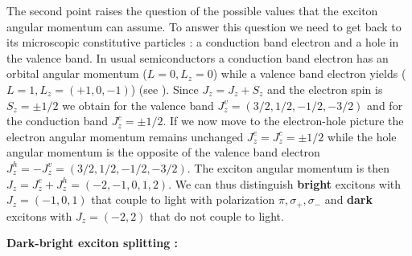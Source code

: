 The second point raises the question of the possible values that the exciton angular momentum can assume. To answer this question we need to get back to its 
microscopic constitutive particles : a conduction band electron and a hole in the valence band. In usual semiconductors a conduction band electron has an orbital angular momentum ($L=0 , L_z=0$) while a valence band electron yields ($L=1 , L_z=(+1,0,-1)$) (see \cite{Combescot_cooper_excitons_2015}).
Since $J_z = J_z + S_z$ and the electron spin is $S_z = \pm 1/2$ we obtain for the valence band $J_z^{v} = (3/2, 1/2, -1/2, -3/2)$ and for the conduction band $J_z^{c} = \pm 1/2$. If we now move to the electron-hole picture the electron angular momentum remains unchanged $J_z^{e}=J_z^{c}= \pm 1/2$ while the hole angular momentum is the opposite of the valence band electron $J_z^{h} = -J_z^{v}=(3/2, 1/2, -1/2, -3/2)$.
 The exciton angular momentum is then $J_z = J_z^{e} + J_z^{h} = (-2,-1,0,1,2)$. We can thus distinguish \textbf{bright} excitons with $J_z = (-1,0,1)$ that couple to light with polarization $\pi , \sigma_+ , \sigma_-$ and \textbf{dark} excitons with $J_z = (-2,2)$ that do not couple to light. 

\textbf{Dark-bright exciton splitting : } 